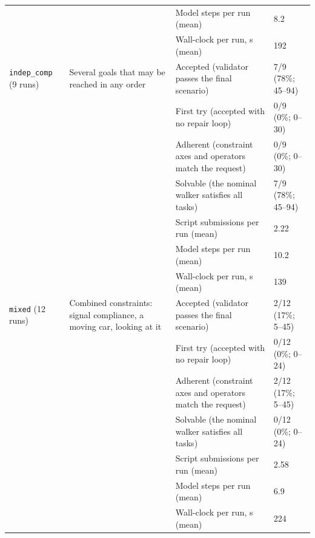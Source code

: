 \begin{longtable}{@{}p{1.7cm}p{2.9cm}p{4.4cm}p{3.1cm}@{}}
 &  & Model steps per run (mean) & 8.2 \\
 &  & Wall-clock per run, s (mean) & 192 \\
\midrule
\texttt{indep\_comp} (9 runs) & Several goals that may be reached in any order & Accepted (validator passes the final scenario) & 7/9 (78\%; 45--94) \\
 &  & First try (accepted with no repair loop) & 0/9 (0\%; 0--30) \\
 &  & Adherent (constraint axes and operators match the request) & 0/9 (0\%; 0--30) \\
 &  & Solvable (the nominal walker satisfies all tasks) & 7/9 (78\%; 45--94) \\
 &  & Script submissions per run (mean) & 2.22 \\
 &  & Model steps per run (mean) & 10.2 \\
 &  & Wall-clock per run, s (mean) & 139 \\
\midrule
\texttt{mixed} (12 runs) & Combined constraints: signal compliance, a moving car, looking at it & Accepted (validator passes the final scenario) & 2/12 (17\%; 5--45) \\
 &  & First try (accepted with no repair loop) & 0/12 (0\%; 0--24) \\
 &  & Adherent (constraint axes and operators match the request) & 2/12 (17\%; 5--45) \\
 &  & Solvable (the nominal walker satisfies all tasks) & 0/12 (0\%; 0--24) \\
 &  & Script submissions per run (mean) & 2.58 \\
 &  & Model steps per run (mean) & 6.9 \\
 &  & Wall-clock per run, s (mean) & 224 \\
\bottomrule
\end{longtable}
